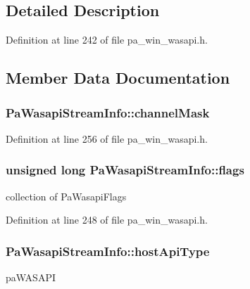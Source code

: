 \subsection{Detailed Description}


Definition at line 242 of file pa\+\_\+win\+\_\+wasapi.\+h.



\subsection{Member Data Documentation}
\subsubsection[{\texorpdfstring{channel\+Mask}{channelMask}}]{ Pa\+Wasapi\+Stream\+Info\+::channel\+Mask}\hypertarget{struct_pa_wasapi_stream_info_a3e893ff6c6f81fb7171ac325136a7dd1}{}\label{struct_pa_wasapi_stream_info_a3e893ff6c6f81fb7171ac325136a7dd1}


Definition at line 256 of file pa\+\_\+win\+\_\+wasapi.\+h.

\subsubsection[{\texorpdfstring{flags}{flags}}]{\setlength{\rightskip}{0pt plus 5cm}unsigned long Pa\+Wasapi\+Stream\+Info\+::flags}\hypertarget{struct_pa_wasapi_stream_info_a85bfbe1a00e6b48df75528eb6f967a2c}{}\label{struct_pa_wasapi_stream_info_a85bfbe1a00e6b48df75528eb6f967a2c}
collection of Pa\+Wasapi\+Flags 

Definition at line 248 of file pa\+\_\+win\+\_\+wasapi.\+h.

\subsubsection[{\texorpdfstring{host\+Api\+Type}{hostApiType}}]{ Pa\+Wasapi\+Stream\+Info\+::host\+Api\+Type}\hypertarget{struct_pa_wasapi_stream_info_a931bf93691d5b36b621d49402d1d2255}{}\label{struct_pa_wasapi_stream_info_a931bf93691d5b36b621d49402d1d2255}
pa\+W\+A\+S\+A\+PI 

